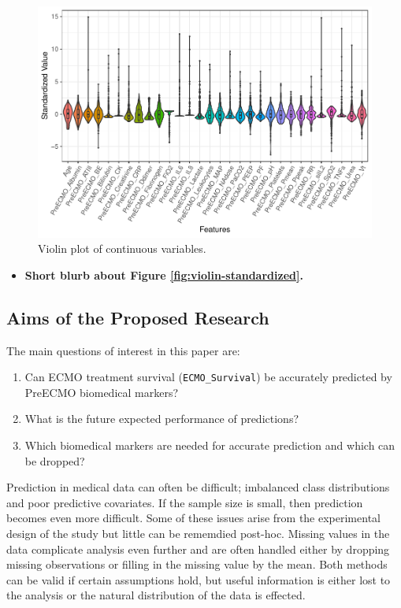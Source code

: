 \documentclass[12pt,]{article}
\providecommand{\tightlist}{%
  \setlength{\itemsep}{0pt}\setlength{\parskip}{0pt}}
\begin{document}
\begin{figure}[H]

{\centering \includegraphics[width=1\linewidth]{figure/graphics-unnamed-chunk-2-1} 

}

\caption{\label{fig:violin-standardized}Violin plot of continuous variables.}\label{fig:unnamed-chunk-2}
\end{figure}

\begin{itemize}
\tightlist
\item
  \textbf{Short blurb about Figure \ref{fig:violin-standardized}.}
\end{itemize}

\subsection{Aims of the Proposed
Research}\label{aims-of-the-proposed-research}

The main questions of interest in this paper are:

\begin{enumerate}
\def\labelenumi{\arabic{enumi}.}
\tightlist
\item
  Can ECMO treatment survival (\texttt{ECMO\_Survival}) be accurately
  predicted by PreECMO biomedical markers?
\item
  What is the future expected performance of predictions?
\item
  Which biomedical markers are needed for accurate prediction and which
  can be dropped?
\end{enumerate}

Prediction in medical data can often be difficult; imbalanced class
distributions and poor predictive covariates. If the sample size is
small, then prediction becomes even more difficult. Some of these issues
arise from the experimental design of the study but little can be
rememdied post-hoc. Missing values in the data complicate analysis even
further and are often handled either by dropping missing observations or
filling in the missing value by the mean. Both methods can be valid if
certain assumptions hold, but useful information is either lost to the
analysis or the natural distribution of the data is effected.
\end{document}
